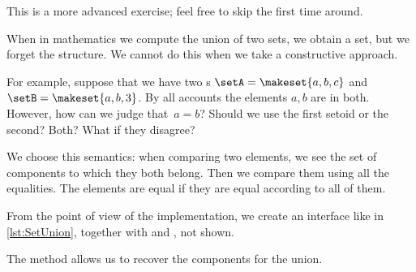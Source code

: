 \begin{remark}
    This is a more advanced exercise; feel free to skip the first time around.
\end{remark}

When in mathematics we compute the union of two sets, we obtain a set, but we forget the structure.
We cannot do this when we take a constructive approach.

For example, suppose that we have two \Setoid{}s $\setA = \makeset{a,b,c}$ and~$\setB = \makeset{a,b,3}$.
By all accounts the elements $a,b$ are in both.
However, how can we judge that~$a=b$?
Should we use the first setoid or the second?
Both?
What if they disagree?

We choose this semantics: when comparing two elements, we see the set of components to which they both belong.
Then we compare them using all the equalities.
The elements are equal if they are equal according to all of them.


From the point of view of the implementation, we create an interface like in \cref{lst:SetUnion}, together with \EnumerableSetUnion and \FiniteSetUnion, not shown.


The method  allows us to recover the components for the union.


\begin{widepar}
\end{widepar}



